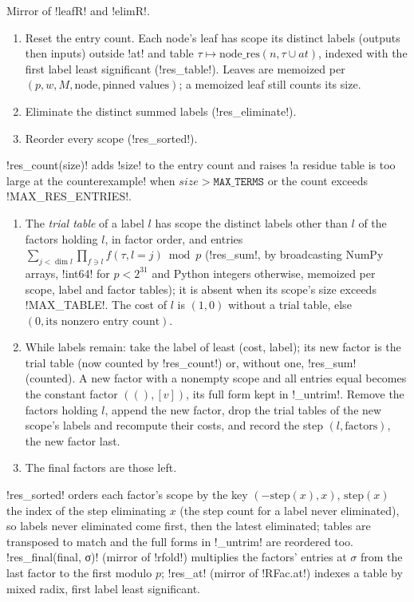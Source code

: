 {{{\begin{algorithm}\label{alg:lean-export-refute-resplan}
Mirror of \lexlean!leafR! and \lexlean!elimR!.
\begin{enumerate}
\item Reset the entry count. Each node's leaf has scope its distinct labels (outputs then
inputs) outside \lexcode!at! and table $\tau \mapsto \mathrm{node\_res}(n, \tau \cup at)$, indexed
with the first label least significant (\lexpy!res_table!). Leaves are memoized per
$(p, w, M, \text{node}, \text{pinned values})$; a memoized leaf still counts its size.
\item Eliminate the distinct summed labels (\lexpy!res_eliminate!).
\item Reorder every scope (\lexpy!res_sorted!).
\end{enumerate}
\lexpy!res_count(size)! adds \lexcode!size! to the entry count and raises
\lexcode!a residue table is too large at the counterexample! when $\mathit{size} >
\mathtt{MAX\_TERMS}$ or the count exceeds \lexpy!MAX_RES_ENTRIES!.
\end{algorithm}

\begin{algorithm}\label{alg:lean-export-refute-elim}
\begin{enumerate}
\item The \emph{trial table} of a label $l$ has scope the distinct labels other than $l$ of the
factors holding $l$, in factor order, and entries
$\sum_{j < \dim l}\prod_{f \ni l} f(\tau, l{=}j) \bmod p$ (\lexpy!res_sum!, by broadcasting
NumPy~\cite{harris2020numpy} arrays, \lexcode!int64! for $p < 2^{31}$ and Python integers otherwise,
memoized per scope, label and factor tables); it is absent when its scope's size exceeds
\lexpy!MAX_TABLE!. The cost of $l$ is $(1, 0)$ without a trial table, else $(0, \text{its nonzero
entry count})$.
\item While labels remain: take the label of least (cost, label); its new factor is the trial
table (now counted by \lexpy!res_count!) or, without one, \lexpy!res_sum! (counted). A new factor with a
nonempty scope and all entries equal becomes the constant factor $((), [v])$, its full form kept
in \lexpy!_untrim!. Remove the factors holding $l$, append the new factor, drop the trial tables of
the new scope's labels and recompute their costs, and record the step $(l, \text{factors})$, the
new factor last.
\item The final factors are those left.
\end{enumerate}
\end{algorithm}
\lexpy!res_sorted! orders each factor's scope by the key
$(-\mathrm{step}(x), x)$, $\mathrm{step}(x)$ the index of the step eliminating $x$ (the step
count for a label never eliminated), so labels never eliminated come first, then the latest
eliminated; tables are transposed to match and the full forms in \lexpy!_untrim! are reordered too.
\lexpy!res_final(final, σ)! (mirror of \lexlean!rfold!) multiplies the factors' entries at $\sigma$
from the last factor to the first modulo $p$; \lexpy!res_at! (mirror of \lexlean!RFac.at!) indexes a
table by mixed radix, first label least significant.

}}}
